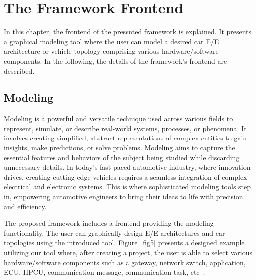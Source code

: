 
\chapter{The Framework Frontend}\label{frontend}

    In this chapter, the frontend of the presented framework is explained. It presents a graphical modeling tool where the user can model a desired car E/E architecture or vehicle topology comprising various hardware/software components. In the following, the details of the framework's frontend are described.
    



    
    \section{Modeling} 
    
    Modeling is a powerful and versatile technique used across various fields to represent, simulate, or describe real-world systems, processes, or phenomena. It involves creating simplified, abstract representations of complex entities to gain insights, make predictions, or solve problems. Modeling aims to capture the essential features and behaviors of the subject being studied while discarding unnecessary details. In today's fast-paced automotive industry, where innovation drives, creating cutting-edge vehicles requires a seamless integration of complex electrical and electronic systems. This is where sophisticated modeling tools step in, empowering automotive engineers to bring their ideas to life with precision and efficiency. 
    
    The proposed framework includes a frontend providing the modeling functionality. 
    The user can graphically design E/E architectures and car topologies using the introduced tool. Figure~\ref{fig5} presents a designed example utilizing our tool where, after creating a project, the user is able to select various hardware/software components such as a gateway, network switch, application, ECU, HPCU, communication message, communication task, etc~\cite{askaripoor2023designer}. 
   

